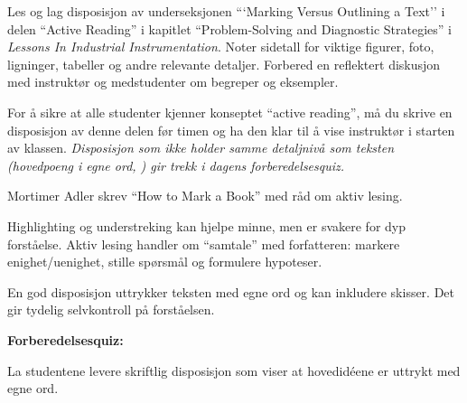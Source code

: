 

Les og lag disposisjon av underseksjonen ```Marking Versus Outlining a Text'' i delen ``Active Reading'' i kapitlet ``Problem-Solving and Diagnostic Strategies'' i {\it Lessons In Industrial Instrumentation}. Noter sidetall for viktige figurer, foto, ligninger, tabeller og andre relevante detaljer. Forbered en reflektert diskusjon med instruktør og medstudenter om begreper og eksempler.

\vskip 30pt

For å sikre at alle studenter kjenner konseptet ``active reading'', må du skrive en disposisjon av denne delen før timen og ha den klar til å vise instruktør i starten av klassen. {\it Disposisjon som ikke holder samme detaljnivå som teksten (hovedpoeng i egne ord, ) gir trekk i dagens forberedelsesquiz.}














Mortimer Adler skrev ``How to Mark a Book'' med råd om aktiv lesing.

\vskip 10pt

Highlighting og understreking kan hjelpe minne, men er svakere for dyp forståelse. Aktiv lesing handler om ``samtale'' med forfatteren: markere enighet/uenighet, stille spørsmål og formulere hypoteser.

\vskip 10pt

En god disposisjon uttrykker teksten med egne ord og kan inkludere skisser. Det gir tydelig selvkontroll på forståelsen.

\vfil \eject

\noindent
{\bf Forberedelsesquiz:}

La studentene levere skriftlig disposisjon som viser at hovedidéene er uttrykt med egne ord.



